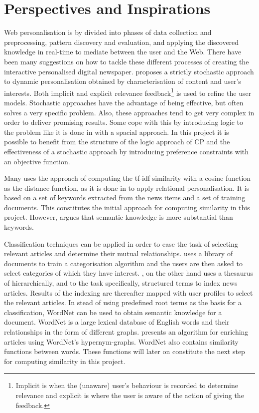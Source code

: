 \chapter{Perspectives and Inspirations}
\label{ch:related_work}
Web personalisation is by \cite{DataMiningMobasher} divided into phases of data collection and preprocessing, pattern discovery and evaluation, and applying the discovered knowledge in real-time to mediate between the user and the Web. There have been many suggestions on how to tackle these different processes of creating the interactive personalised digital newspaper. \cite{gervasum2001ws.pdf} proposes a strictly stochastic approach to dynamic personalisation obtained by characterisation of content and user's interests. Both implicit and explicit relevance feedback\footnote{Implicit is when the (unaware) user's behaviour is recorded to determine relevance and explicit is where the user is aware of the action of giving the feedback.} is used to refine the user models. Stochastic approaches have the advantage of being effective, but often solves a very specific problem. Also, these approaches tend to get very complex in order to deliver promising results. Some cope with this by introducing logic to the problem like it is done in \cite{SpacialLogicNilsson} with a spacial approach. In this project it is possible to benefit from the structure of the logic approach of CP and the effectiveness of a stochastic approach by introducing preference constraints with an objective function.


Many uses the approach of computing the tf-idf similarity with a cosine function as the distance function, as it is done in \cite{fulltext.pdf} to apply relational personalisation. It is based on a set of keywords extracted from the news items and a set of training documents. This constitutes the initial approach for computing similarity in this project. However, \cite{10-1-1-19-5583} argues that semantic knowledge is more substantial than keywords. 

Classification techniques can be applied in order to ease the task of selecting relevant articles and determine their mutual relationships. \cite{gervasum2001ws.pdf} uses a library of documents to train a categorisation algorithm and the users are then asked to select categories of which they have interest. \cite{10-1-1-19-5583}, on the other hand uses a thesaurus of hierarchically, and to the task specifically, structured terms to index news articles. Results of the indexing are thereafter mapped with user profiles to select the relevant articles. In stead of using predefined root terms as the basis for a classification, WordNet can be used to obtain semantic knowledge for a document. WordNet is a large lexical database of English words and their relationships in the form of different graphs. \cite{116262780379.pdf} presents an algorithm for enriching articles using WordNet's hypernym-graphs. WordNet also contains similarity functions between words. These functions will later on constitute the next step for computing similarity in this project.

